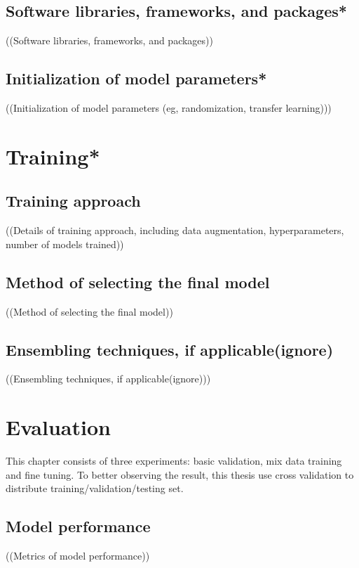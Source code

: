 \subsection{Software libraries, frameworks, and packages*}
((Software libraries, frameworks, and packages)) \\
\subsection{Initialization of model parameters*}
((Initialization of model parameters (eg, randomization, transfer learning))) \\



\section{Training*}
\subsection{Training approach}
((Details of training approach, including data augmentation, hyperparameters, number of models trained)) \\
\subsection{Method of selecting the final model}
((Method of selecting the final model)) \\
\subsection{Ensembling techniques, if applicable(ignore)}
((Ensembling techniques, if applicable(ignore))) \\

\section{Evaluation}
This chapter consists of three experiments: basic validation, mix data training and fine tuning. To better observing the result, this thesis use cross validation to distribute training/validation/testing set. 


\subsection{Model performance}
((Metrics of model performance)) \\

